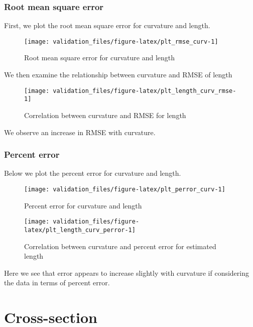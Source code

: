 \documentclass[
]{article}
\begin{document}
\hypertarget{root-mean-square-error}{%
\subsubsection{Root mean square error}\label{root-mean-square-error}}

First, we plot the root mean square error for curvature and length.

\begin{figure}
\texttt{[image: validation\_files/figure-latex/plt\_rmse\_curv-1]} \caption{Root mean square error for curvature and length}\label{fig:plt_rmse_curv}
\end{figure}

We then examine the relationship between curvature and RMSE of length

\begin{figure}
\texttt{[image: validation\_files/figure-latex/plt\_length\_curv\_rmse-1]} \caption{Correlation between curvature and RMSE for length}\label{fig:plt_length_curv_rmse}
\end{figure}

We observe an increase in RMSE with curvature.

\hypertarget{percent-error}{%
\subsubsection{Percent error}\label{percent-error}}

Below we plot the percent error for curvature and length.

\begin{figure}
\texttt{[image: validation\_files/figure-latex/plt\_perror\_curv-1]} \caption{Percent error for curvature and length}\label{fig:plt_perror_curv}
\end{figure}

\begin{figure}
\texttt{[image: validation\_files/figure-latex/plt\_length\_curv\_perror-1]} \caption{Correlation between curvature and percent error for estimated length}\label{fig:plt_length_curv_perror}
\end{figure}

Here we see that error appears to increase slightly with curvature if
considering the data in terms of percent error.

\hypertarget{cross-section}{%
\section{Cross-section}\label{cross-section}}
\end{document}
